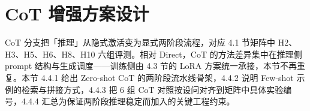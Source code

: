 \section{CoT 增强方案设计}

CoT 分支把「推理」从隐式激活变为显式两阶段流程，对应 4.1 节矩阵中 H2、H3、H5、H6、H8、H10 六组评测。相对 Direct，CoT 的方法差异集中在推理侧 prompt 结构与生成调度——训练侧由 4.3 节的 LoRA 方案统一承接，本节不再重复。本节 4.4.1 给出 Zero-shot CoT 的两阶段流水线骨架，4.4.2 说明 Few-shot 示例的检索与拼接方式，4.4.3 把 6 组 CoT 对照按设问对齐到矩阵中具体实验编号，4.4.4 汇总为保证两阶段推理稳定而加入的关键工程约束。





